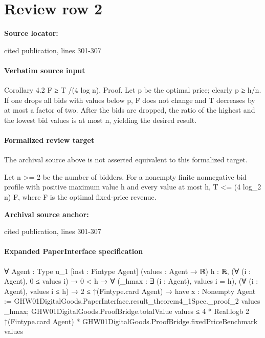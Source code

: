 \documentclass[10pt]{article}
\begin{document}
\section*{Review row 2}
\textbf{Source locator:} {\footnotesize\raggedright cited publication, lines 301-\allowbreak{}307\par}
\paragraph{Verbatim source input}
\begin{ReviewVerbatim}
Corollary 4.2 F ≥ T /(4 log n).
Proof. Let p be the optimal price; clearly p ≥ h/n.
If one drops all bids with values below p, F does not
change and T decreases by at most a factor of two.
After the bids are dropped, the ratio of the highest
and the lowest bid values is at most n, yielding the
desired result.
\end{ReviewVerbatim}


\paragraph{Formalized review target}
The archival source above is not asserted equivalent to this formalized target.
\begin{ReviewVerbatim}
Let n >= 2 be the number of bidders. For a nonempty finite nonnegative bid profile with positive maximum value h and every value at most h, T <= (4 log_2 n) F, where F is the optimal fixed-price revenue.
\end{ReviewVerbatim}

\textbf{Archival source anchor:} {\footnotesize\raggedright cited publication, lines 301-\allowbreak{}307\par}
\paragraph{Expanded PaperInterface specification}
\begin{ReviewVerbatim}
∀ {Agent : Type u_1} [inst : Fintype Agent] (values : Agent → ℝ) {h : ℝ},
  (∀ (i : Agent), 0 ≤ values i) →
    0 < h →
      ∀ (_hmax : ∃ (i : Agent), values i = h),
        (∀ (i : Agent), values i ≤ h) →
          2 ≤ ↑(Fintype.card Agent) →
            have x : Nonempty Agent := GHW01DigitalGoods.PaperInterface.result_theorem4_1Spec._proof_2 values _hmax;
            GHW01DigitalGoods.ProofBridge.totalValue values ≤
              4 * Real.logb 2 ↑(Fintype.card Agent) * GHW01DigitalGoods.ProofBridge.fixedPriceBenchmark values
\end{ReviewVerbatim}
\end{document}
